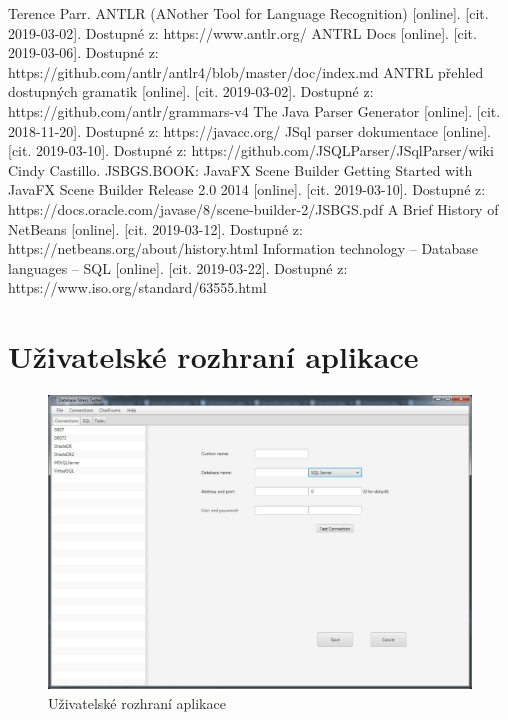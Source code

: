 \documentclass[czech,bachelor,public,dept460,male,cpdeclaration,twoside]{diploma}
\begin{document}
\begin{thebibliography}{99}
	 Terence Parr. ANTLR (ANother Tool for Language Recognition) [online]. [cit. 2019-03-02]. Dostupné z: https://www.antlr.org/
	 ANTRL Docs [online]. [cit. 2019-03-06]. Dostupné z: https://github.com/antlr/antlr4/blob/master/doc/index.md
	 ANTRL přehled dostupných gramatik [online]. [cit. 2019-03-02]. Dostupné z: https://github.com/antlr/grammars-v4
	 The Java Parser Generator [online]. [cit. 2018-11-20]. Dostupné z: https://javacc.org/
	 JSql parser dokumentace [online]. [cit. 2019-03-10]. Dostupné z: https://github.com/JSQLParser/JSqlParser/wiki
	 Cindy Castillo. JSBGS.BOOK: JavaFX Scene Builder Getting Started with JavaFX Scene Builder Release 2.0 2014 [online]. [cit. 2019-03-10]. Dostupné z: https://docs.oracle.com/javase/8/scene-builder-2/JSBGS.pdf
	 A Brief History of NetBeans [online]. [cit. 2019-03-12]. Dostupné z: https://netbeans.org/about/history.html
	 Information technology -- Database languages -- SQL [online]. [cit. 2019-03-22]. Dostupné z: https://www.iso.org/standard/63555.html
	
	
	
	
	
\end{thebibliography}


\appendix %
\section{Uživatelské rozhraní aplikace}
\begin{figure}[!h]\centering\includegraphics[width=1.0\textwidth]{Figures/GUI1.jpg}\caption{Uživatelské rozhraní aplikace}
\end{figure}
\end{document}
